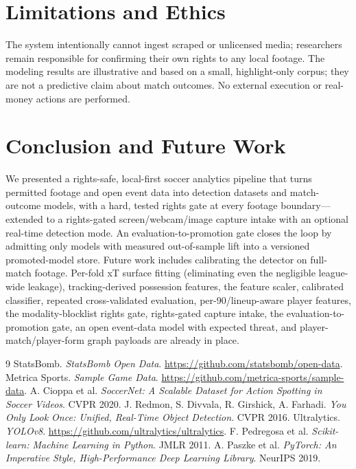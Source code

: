 \documentclass[11pt]{article}
\begin{document}
\section{Limitations and Ethics}
The system intentionally cannot ingest scraped or unlicensed media; researchers
remain responsible for confirming their own rights to any local footage. The
modeling results are illustrative and based on a small, highlight-only corpus;
they are not a predictive claim about match outcomes. No external execution or
real-money actions are performed.

\section{Conclusion and Future Work}
We presented a rights-safe, local-first soccer analytics pipeline that turns
permitted footage and open event data into detection datasets and match-outcome
models, with a hard, tested rights gate at every footage boundary---extended to
a rights-gated screen/webcam/image capture intake with an optional real-time
detection mode. An evaluation-to-promotion gate closes the loop by admitting only
models with measured out-of-sample lift into a versioned promoted-model store.
Future work includes calibrating the detector on full-match footage. Per-fold xT
surface fitting (eliminating even the negligible league-wide leakage),
tracking-derived possession features, the feature scaler, calibrated classifier,
repeated cross-validated evaluation, per-90/lineup-aware player features, the
modality-blocklist rights gate, rights-gated capture intake, the
evaluation-to-promotion gate, an open event-data model with expected threat,
and player-match/player-form graph payloads are already in place.


\begin{thebibliography}{9}
 StatsBomb. \emph{StatsBomb Open Data}. \url{https://github.com/statsbomb/open-data}.
 Metrica Sports. \emph{Sample Game Data}. \url{https://github.com/metrica-sports/sample-data}.
 A. Cioppa et al. \emph{SoccerNet: A Scalable Dataset for Action Spotting in Soccer Videos}. CVPR 2020.
 J. Redmon, S. Divvala, R. Girshick, A. Farhadi. \emph{You Only Look Once: Unified, Real-Time Object Detection}. CVPR 2016.
 Ultralytics. \emph{YOLOv8}. \url{https://github.com/ultralytics/ultralytics}.
 F. Pedregosa et al. \emph{Scikit-learn: Machine Learning in Python}. JMLR 2011.
 A. Paszke et al. \emph{PyTorch: An Imperative Style, High-Performance Deep Learning Library}. NeurIPS 2019.
\end{thebibliography}
\end{document}
